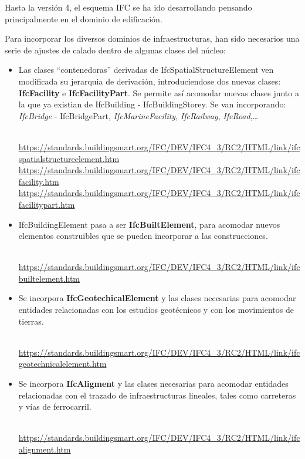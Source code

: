 \documentclass[spanish,10pt,a4paper,final,oneside]{article}
\begin{document}
Hasta la versión 4, el esquema IFC se ha ido desarrollando pensando principalmente en el dominio de edificación.

Para incorporar los diversos dominios de infraestructuras, han sido necesarios una serie de ajustes de calado dentro de algunas clases del núcleo:
\begin{itemize}
\item Las clases ``contenedoras'' derivadas de IfcSpatialStructureElement ven modificada su jerarquia de derivación, introduciendose dos nuevas clases: \textbf{IfcFacility} e \textbf{IfcFacilityPart}. Se permite así acomodar nuevas clases junto a la que ya existian de IfcBuilding - IfcBuildingStorey. Se van incorporando: \textit{IfcBridge} - IfcBridgePart, \textit{IfcMarineFacility}, \textit{IfcRailway}, \textit{IfcRoad},\ldots
\begin{footnotesize}
\\ \url{https://standards.buildingsmart.org/IFC/DEV/IFC4_3/RC2/HTML/link/ifcspatialstructureelement.htm}
\\ \url{https://standards.buildingsmart.org/IFC/DEV/IFC4_3/RC2/HTML/link/ifcfacility.htm}
\\ \url{https://standards.buildingsmart.org/IFC/DEV/IFC4_3/RC2/HTML/link/ifcfacilitypart.htm}
\end{footnotesize}

\item IfcBuildingElement pasa a ser \textbf{IfcBuiltElement}, para acomodar nuevos elementos construibles que se pueden incorporar a las construcciones.
\begin{footnotesize}
\\ \url{https://standards.buildingsmart.org/IFC/DEV/IFC4_3/RC2/HTML/link/ifcbuiltelement.htm}
\end{footnotesize}

\item Se incorpora \textbf{IfcGeotechicalElement} y las clases necesarias para acomodar entidades relacionadas con los estudios geotécnicos y con los movimientos de tierras.
\begin{footnotesize}
\\ \url{https://standards.buildingsmart.org/IFC/DEV/IFC4_3/RC2/HTML/link/ifcgeotechnicalelement.htm}
\end{footnotesize}

\item Se incorpora \textbf{IfcAligment} y las clases necesarias para acomodar entidades relacionadas con el trazado de infraestructuras lineales, tales como carreteras y vías de ferrocarril.
\begin{footnotesize}
\\ \url{https://standards.buildingsmart.org/IFC/DEV/IFC4_3/RC2/HTML/link/ifcalignment.htm}

\end{footnotesize}
\end{itemize} 
\end{document}
